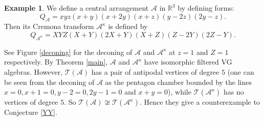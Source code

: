 \documentclass{amsart}
\numberwithin{equation}{section}
\theoremstyle{plain}
\theoremstyle{remark}
\theoremstyle{definition}
\newtheorem{ex}[thm]{Example}
\numberwithin{equation}{section}
\newcommand{\R}{\mathbb{R}}
\newcommand{\A}{\mathcal{A}}
\newcommand{\T}{\mathcal{T}}
\begin{document}
\begin{ex}\label{counterexample}
    We define a central arrangement $\A$ in $\R^3$ by defining forms:
\[
Q_\A=xyz(x+y)(x+2y)(x+z)(y-2z)(2y-z).
\]
Then its Cremona transform $\A^\kappa$ is defined by \[
Q_{\A^\kappa}=XYZ(X+Y)(2X+Y)(X+Z)(Z-2Y)(2Z-Y).
\]

See Figure \ref{deconing} for the deconing of $\A$ and $\A^\kappa$ at $z=1$ and $Z=1$ respectively. By Theorem \ref{main}, $\A$ and $\A^\kappa$ have isomorphic filtered VG algebras. However, $\T(\A)$ has a pair of antipodal vertices of degree $5$ (one can be seen from the deconing of $\A$ as the pentagon chamber bounded by the lines $x=0,x+1=0,y-2=0,2y-1=0$ and $x+y=0$), while $\T(\A^\kappa)$ has no vertices of degree $5$. So $\T(\A)\not\cong\T(\A^\kappa)$. Hence they give a counterexample to Conjecture \ref{YY}.
\end{ex}
\end{document}
